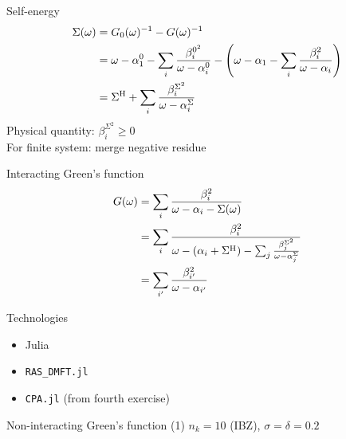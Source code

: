 \documentclass[aspectratio=169]{beamer}
\begin{document}
\begin{frame}{Self-energy}
    \begin{align}
        \Sigma(\omega) & = G_0(\omega)^{-1} - G(\omega)^{-1}                                       \\
                       & = \omega - \alpha^0_1 - \sum_i \frac{\beta_i^{0^2}}{\omega - \alpha_i^0}
        - \left(\omega - \alpha_1 - \sum_i \frac{\beta_i^2}{\omega - \alpha_i}\right)              \\
                       & = \Sigma^{\mathrm{H}} + \sum_i \frac{\beta_i^{\Sigma^2}}{\omega - \alpha_i^\Sigma}
    \end{align}
    Physical quantity: $\beta_i^{\Sigma^2} \ge 0$ \\
    For finite system: merge negative residue
\end{frame}

\begin{frame}{Interacting Green's function}
    \begin{align}
        G(\omega) & = \sum_i \frac{\beta_i^2}{\omega - \alpha_i - \Sigma(\omega)}                                                            \\
                  & = \sum_i \frac{\beta_i^2}{\omega - (\alpha_i + \Sigma^{\mathrm{H}}) - \sum_j \frac{\beta_j^{\Sigma^2}}{\omega - \alpha_j^\Sigma}} \\
                  & = \sum_{i'} \frac{\beta_{i'}^2}{\omega - \alpha_{i'}}
    \end{align}
\end{frame}

\begin{frame}{Technologies}
    \begin{itemize}
        \item Julia~
        \item \texttt{RAS\_DMFT.jl}~
        \item \texttt{CPA.jl} (from fourth exercise)
    \end{itemize}
\end{frame}

\begin{frame}{Non-interacting Green's function (1)}
    $n_k = 10$ (IBZ), $\sigma = \delta = 0.2$

    \begin{centering}
        
    \end{centering}
\end{frame}
\end{document}
